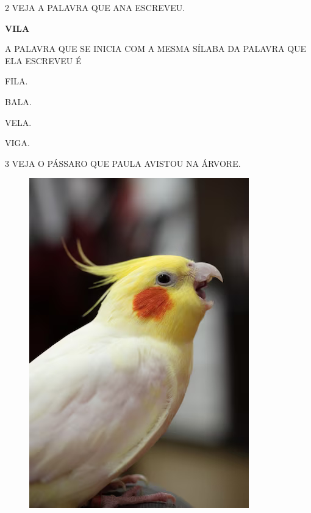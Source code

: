 \num{2} VEJA A PALAVRA QUE ANA ESCREVEU.

\begin{myquote}
\begin{center}
\textbf{VILA}
\end{center}
\end{myquote}

A PALAVRA QUE SE INICIA COM A MESMA SÍLABA DA PALAVRA QUE ELA ESCREVEU É

\begin{escolha}

\item FILA.

\item BALA.

\item VELA.

\item VIGA.

\end{escolha}

\num{3} VEJA O PÁSSARO QUE PAULA AVISTOU NA ÁRVORE.

\begin{figure}[H]
\centering
\includegraphics[width=.75\textwidth]{./media/image231.png}
\end{figure}

